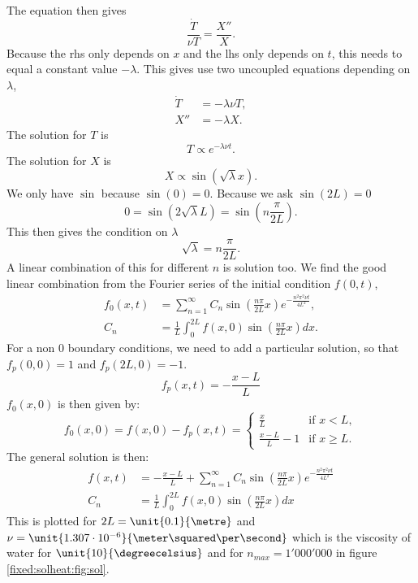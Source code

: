 The equation then gives
\begin{equation}
	\frac{\dot{T}}{\nu T}=\frac{X''}{X}.
\end{equation}
Because the rhs only depends on $x$ and the lhs only depends on $t$, this needs to equal a constant value $-\lambda$.
This gives use two uncoupled equations depending on $\lambda$,
\begin{align}
\dot{T}&=-\lambda \nu T,\\
X''&=-\lambda X.
\end{align}
The solution for $T$ is
\begin{equation}
  T\propto e^{-\lambda \nu t}.
\end{equation}
The solution for $X$ is
\begin{equation}
	X\propto \sin(\sqrt{\lambda} x).
\end{equation}
We only have $\sin$ because $\sin(0)=0$.
Because we ask $\sin(2L)=0$
\begin{equation}
	0=\sin(2\sqrt{\lambda} L)=\sin\left(n\frac{\pi}{2L}\right).
\end{equation}
This then gives the condition on $\lambda$
\begin{equation}
	\sqrt{\lambda}=n\frac{\pi}{2L}.
\end{equation}
A linear combination of this for different $n$ is solution too.
We find the good linear combination from the Fourier series of the initial condition $f(0,t)$,
\begin{align}
  f_0(x,t)&=\sum_{n=1}^{\infty}C_{n}\sin\left(\frac{n\pi}{2L}x\right)e^{-\frac{n^2\pi^2\nu t}{4L^2}},\\
  C_{n}&=\frac{1}{L}\int_{0}^{2L}f(x,0)\sin\left(\frac{n\pi}{2L}x\right) dx.
\end{align}
For a non 0 boundary conditions, we need to add a particular solution, so that $f_p(0,0)=1$ and $f_p(2L,0)=-1$.
\begin{equation}
	f_{p}(x,t)=-\frac{x-L}{L}
\end{equation}
$f_{0}(x,0)$ is then given by:
\begin{equation}
  f_{0}(x,0)=f(x,0)-f_{p}(x,t)=\begin{cases}
                               	\frac{x}{L}&\text{if $x<L$},\\
                               	\frac{x-L}{L}-1&\text{if $x\geq L$.}
                               \end{cases}
\end{equation}
The general solution is then:
\begin{align}
  f(x,t)&=-\frac{x-L}{L}+\sum_{n=1}^{\infty}C_{n}\sin\left(\frac{n\pi}{2L}x\right)e^{-\frac{n^2\pi^2\nu t}{4L^2}}\\
  C_{n}&=\frac{1}{L}\int_{0}^{2L}f(x,0)\sin\left(\frac{n\pi}{2L}x\right) dx
\end{align}
This is plotted for $2L=\unit{0.1}{\metre}$ and $\nu=\unit{1.307\cdot 10^{-6}}{\meter \squared \per \second}$ which is the viscosity of water for $\unit{10}{\degreecelsius}$ and for $n_{max}=1'000'000$ in figure \ref{fixed:solheat:fig:sol}.

